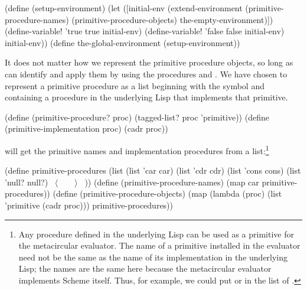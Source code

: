 \begin{codeBlock}
(define (setup-environment)
  (let ([initial-env (extend-environment
                       (primitive-procedure-names)
                       (primitive-procedure-objects)
                       the-empty-environment)])
    (define-variable! 'true true initial-env)
    (define-variable! 'false false initial-env)
    initial-env))
(define the-global-environment (setup-environment))
\end{codeBlock}

\noindent
It does not matter how we represent the primitive procedure objects, so long as
 can identify and apply them by using the procedures
 and .  We have
chosen to represent a primitive procedure as a list beginning with the symbol
 and containing a procedure in the underlying Lisp that
implements that primitive.

\begin{codeBlock}
(define (primitive-procedure? proc)
  (tagged-list? proc 'primitive))
(define (primitive-implementation proc) (cadr proc))
\end{codeBlock}

\noindent
{} will get the primitive names and implementation
procedures from a list:\footnote{Any procedure defined in the underlying Lisp
can be used as a primitive for the metacircular evaluator.  The name of a
primitive installed in the evaluator need not be the same as the name of its
implementation in the underlying Lisp; the names are the same here because the
metacircular evaluator implements Scheme itself.  Thus, for example, we could
put  or  in
the list of .}

\begin{codeBlock}
(define primitive-procedures
  (list (list 'car car)
        (list 'cdr cdr)
        (list 'cons cons)
        (list 'null? null?)
        ~\(\langle \)~~~~\(\rangle \)~ ))
(define (primitive-procedure-names)
  (map car primitive-procedures))
(define (primitive-procedure-objects)
  (map (lambda (proc) (list 'primitive (cadr proc)))
       primitive-procedures))
\end{codeBlock}

